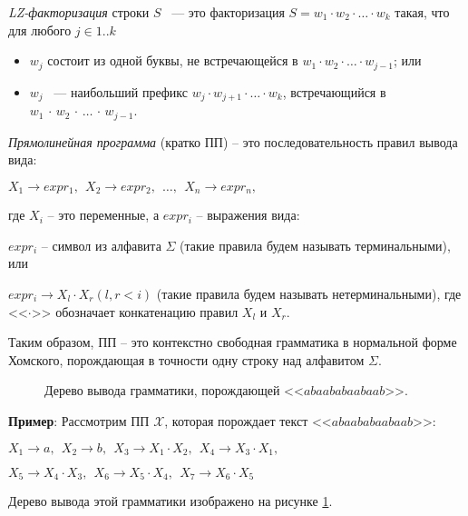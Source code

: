 \documentclass[14pt]{article}
\begin{document}
\emph{LZ-факторизация} строки $S$ ~--- это факторизация $S = w_1\cdot w_2 \cdot \ldots \cdot w_k$ такая, что
для любого $j \in 1..k$
\begin{itemize}
	\item $w_j$ состоит из одной буквы, не встречающейся в $w_1 \cdot w_2 \cdot \ldots \cdot w_{j-1}$; или
	\item $w_j$ ~--- наибольший префикс $w_j \cdot w_{j+1} \cdot \ldots \cdot w_k$, встречающийся в \newline
	$w_1\,\cdot\,w_2\,\cdot\,\ldots\,\cdot\,w_{j-1}$.
\end{itemize}

\emph{Прямолинейная программа} (кратко ПП) -- это последовательность правил вывода вида:

\begin{center}
$X_1 \to expr_1,~~X_2 \to expr_2,~~\ldots,~~X_n \to expr_n,$
\end{center}
где $X_i$ -- это переменные, а $expr_i$ -- выражения вида:

\begin{itemize}
\begin{item}
$expr_i$ -- символ из алфавита $\Sigma$ (такие правила будем называть терминальными), или
\end{item}
\begin{item}
$expr_i \to X_l\cdot X_r (l, r < i)$ (такие правила будем называть
нетерминальными), где <<$\cdot$>> обозначает конкатенацию правил $X_l$ и $X_r$.
\end{item}
\end{itemize}

Таким образом, ПП -- это контекстно свободная грамматика в нормальной форме Хомского, порождающая в точности одну строку над алфавитом
$\Sigma$.

\begin{figure}[t]
	\picFibonacciSLP{}	
	\caption{Дерево вывода грамматики, порождающей <<$abaababaabaab$>>.}
	\label{SLPTreeExample}
\end{figure}

{\bf Пример}: Рассмотрим ПП $\mathcal{X}$, которая порождает текст <<$abaababaabaab$>>:

\begin{center}
$X_1 \to a,~~X_2 \to b,~~X_3 \to X_1\cdot X_2,~~X_4 \to X_3\cdot X_1,$

$X_5 \to X_4\cdot X_3,~~X_6 \to X_5\cdot X_4,~~X_7 \to X_6\cdot X_5$
\end{center}
Дерево вывода этой грамматики изображено на рисунке \ref{SLPTreeExample}.
\end{document}
